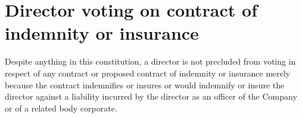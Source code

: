 \section{Director voting on contract of indemnity or insurance}

Despite anything in this constitution, a director is not precluded from voting in respect of any contract or proposed contract of indemnity or insurance merely because the contract indemnifies or insures or would indemnify or insure the director against a liability incurred by the director as an officer of the Company or of a related body corporate. 